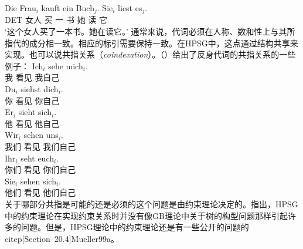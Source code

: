 \ea
\gll Die Frau$_i$ kauft ein Buch$_j$. Sie$_i$ liest es$_j$.\\
	  DET 女人 买 一 书 她 读 它\\
\glt `这个女人买了一本书。她在读它。'
\z
通常来说，代词必须在人称、数和性上与其所指代的成分相一致。相应的标引需要保持一致。在HPSG中，这点通过结构共享来实现。也可以说共指关系（\textit{coindexation}）。（）给出了反身代词的共指关系的一些例子：
\eal
\ex
\gll Ich$_i$ sehe mich$_i$.\\
     我 看见 我自己\\
\ex 
\gll Du$_i$ siehst dich$_i$.\\
     你 看见 你自己\\
\ex 
\gll Er$_i$ sieht sich$_i$.\\
     他 看见 他自己\\
\ex 
\gll Wir$_i$ sehen uns$_i$.\\
     我们      看见   我们自己\\
\ex 
\gll Ihr$_i$ seht euch$_i$.\\
     你们 看见 你们自己\\
\ex 
\gll Sie$_i$ sehen sich$_i$.\\
     他们 看见 他们自己\\
\zl
关于哪部分共指是可能的还是必须的这个问题是由约束理论决定的。\citet{PS92,ps2}指出，HPSG中的约束理论在实现约束关系时并没有像GB理论中关于树的构型问题那样引起许多的问题。但是，HPSG理论中的约束理论还是有一些公开的问题的citep[Section~20.4]{Mueller99a}。

